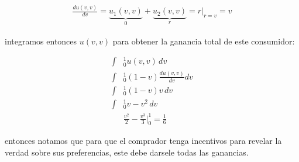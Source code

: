 \documentclass[11pt]{article}
\begin{document}
\begin{flushleft}
    \begin{align*}
        \frac{du(v,v)}{dv}=\underbrace{u_1(v,v)}_{0}+\underbrace{u_2(v,v)}_{r}=r\Big|_{r=v}=v
    \end{align*}

    integramos entonces $u(v,v)$ para obtener la ganancia total de este consumidor:

    \begin{align*}
        \int&_{0}^{1} u(v,v)\,dv\\
        \int&_{0}^{1} (1-v)\frac{du(v,v)}{dv}dv\\
        \int&_{0}^{1} (1-v)v\,dv\\
        \int&_{0}^{1} v-v^2\,dv\\
        &\frac{v^2}{2}-\frac{v^3}{3}\Big|^1_0=\frac{1}{6}
    \end{align*}

    entonces notamos que para que el comprador tenga incentivos para revelar la verdad sobre sus preferencias, este debe darsele todas las ganancias.
\end{flushleft}

\newpage
\medskip

\nocite{*}
 

\newpage
\end{document}
